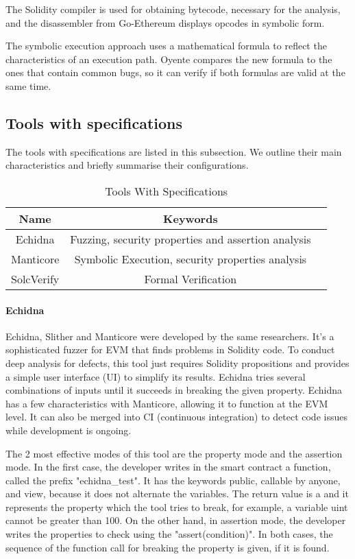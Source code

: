 \documentclass[a4paper,sigconf, language=french,
language=german, language=spanish, language=english]{acmart}
\begin{document}
The Solidity compiler is used for obtaining bytecode, necessary for the analysis, and the disassembler from
Go-Ethereum displays opcodes in symbolic form.

The symbolic execution approach uses a mathematical formula to reflect the characteristics of an execution path.
Oyente compares the new formula to the ones that contain common bugs, so it can verify if both formulas are valid at the same time. 

\subsection{Tools with specifications}

The tools with specifications are listed in this subsection. We outline their main characteristics and briefly summarise their configurations.

\begin{table*}
  \caption{Tools With Specifications}
  \label{TollsWithSpec}
  \begin{tabular}{ccl}
    \toprule
    Name & Keywords \\
    \midrule
    Echidna  & Fuzzing, security properties and assertion analysis\\
    Manticore  & Symbolic Execution, security properties analysis \\
    SolcVerify & Formal Verification \\
    \hline
  \end{tabular}
\end{table*}


\paragraph{Echidna} 
Echidna, Slither and Manticore were developed by the same researchers.
It's a sophisticated fuzzer for EVM that finds problems in Solidity code.
To conduct deep analysis for defects, this tool just requires Solidity propositions and provides a simple user interface (UI) to simplify its results.
Echidna tries several combinations of inputs until it succeeds in breaking the given property.
Echidna has a few characteristics with Manticore, allowing it to function at the EVM level.
It can also be merged into CI (continuous integration) to detect code issues while development is ongoing. 

The 2 most effective modes of this tool are the property mode and the assertion mode. In the first case, the developer writes in the smart contract a function, called the prefix "echidna\_test". It has the keywords public, callable by anyone, and view, because it does not alternate the variables. The return value is a  and it represents the property which the tool tries to break, for example, a variable uint cannot be greater than 100. On the other hand, in assertion mode, the developer writes the properties to check using the "assert(condition)". In both cases, the sequence of the function call for breaking the property is given, if it is found.
\end{document}
